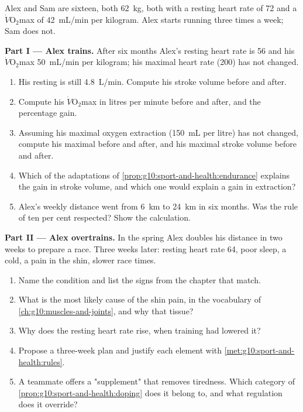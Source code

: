 \begin{problem}
\label{pb:g10:sport-and-health:1}
Alex and Sam are sixteen, both \qty{62}{kg}, both with a resting heart
rate of 72 and a $\dot V\!\mathrm{O_2}$max of \qty{42}{mL/min} per
kilogram. Alex starts running three times a week; Sam does not.

\medskip
\noindent\textbf{Part I --- Alex trains.}
After six months Alex's resting heart rate is 56 and his
$\dot V\!\mathrm{O_2}$max \qty{50}{mL/min} per kilogram; his maximal
heart rate (200) has not changed.
\begin{enumerate}
  \item His resting  is still \qty{4.8}{L/min}. Compute
        his stroke volume before and after.
  \item Compute his $\dot V\!\mathrm{O_2}$max in litres per minute
        before and after, and the percentage gain.
  \item Assuming his maximal oxygen extraction (\qty{150}{mL} per
        litre) has not changed, compute his maximal 
        before and after, and his maximal stroke volume before and
        after.
  \item Which of the adaptations of
        \cref{prop:g10:sport-and-health:endurance} explains the gain in
        stroke volume, and which one would explain a gain in
        extraction?
  \item Alex's weekly distance went from \qty{6}{km} to \qty{24}{km}
        in six months. Was the rule of ten per cent respected? Show
        the calculation.
\end{enumerate}

\medskip
\noindent\textbf{Part II --- Alex overtrains.}
In the spring Alex doubles his distance in two weeks to prepare a
race. Three weeks later: resting heart rate 64, poor sleep, a cold, a
pain in the shin, slower race times.
\begin{enumerate}[resume]
  \item Name the condition and list the signs from the chapter that
        match.
  \item What is the most likely cause of the shin pain, in the
        vocabulary of \cref{ch:g10:muscles-and-joints}, and why that
        tissue?
  \item Why does the resting heart rate rise, when training had
        lowered it?
  \item Propose a three-week plan and justify each element with
        \cref{met:g10:sport-and-health:rules}.
  \item A teammate offers a "supplement" that removes tiredness. Which
        category of \cref{prop:g10:sport-and-health:doping} does it
        belong to, and what regulation does it override?
\end{enumerate}


\end{problem}
